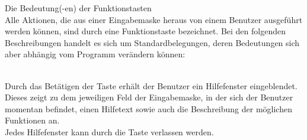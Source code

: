 \begin{Keys}{Die Bedeutung(-en) der Funktionstasten}\\
Alle Aktionen, die aus einer Eingabemaske heraus von einem
Benutzer ausgef\"{u}hrt werden k\"{o}nnen, sind durch eine
Funktionstaste bezeichnet. Bei den folgenden Beschreibungen handelt es sich um Standardbelegungen, deren
Bedeutungen sich aber abh\"{a}ngig vom Programm ver\"{a}ndern k\"{o}nnen:


\\
{Durch das Bet\"{a}tigen der Taste  erh\"{a}lt der Benutzer ein
Hilfefenster eingeblendet. Dieses zeigt zu dem jeweiligen Feld der
Eingabemaske, in der sich der Benutzer momentan befindet, einen
Hilfetext sowie auch die Beschreibung der m\"{o}glichen Funktionen an.\\
Jedes Hilfefenster kann durch die Taste  verlassen werden.}


\end{Keys}
